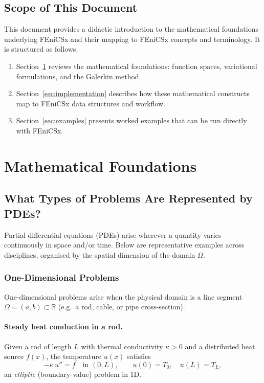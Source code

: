 \documentclass[11pt]{article}
\newcommand{\R}{\mathbb{R}}
\newcommand{\domain}{\Omega}
\begin{document}
\subsection{Scope of This Document}

This document provides a didactic introduction to the mathematical foundations
underlying FEniCSx and their mapping to FEniCSx concepts and terminology.
It is structured as follows:
\begin{enumerate}
  \item Section~\ref{sec:math} reviews the mathematical foundations:
    function spaces, variational formulations, and the Galerkin method.
  \item Section~\ref{sec:implementation} describes how these mathematical
    constructs map to FEniCSx data structures and workflow.
  \item Section~\ref{sec:examples} presents worked examples that can be
    run directly with FEniCSx.
\end{enumerate}

\section{Mathematical Foundations}
\label{sec:math}

\subsection{What Types of Problems Are Represented by PDEs?}
\label{subsec:pde-types}

Partial differential equations (PDEs) arise wherever a quantity varies
continuously in space and/or time.
Below are representative examples across disciplines, organised by the spatial
dimension of the domain $\domain$.

\subsubsection{One-Dimensional Problems}

One-dimensional problems arise when the physical domain is a line segment
$\domain = (a,b) \subset \R$ (e.g.\ a rod, cable, or pipe cross-section).

\paragraph{Steady heat conduction in a rod.}
Given a rod of length $L$ with thermal conductivity $\kappa > 0$ and a
distributed heat source $f(x)$, the temperature $u(x)$ satisfies
\begin{equation*}
  -\kappa\,u'' = f \quad \text{in } (0,L),
  \qquad u(0) = T_0,\quad u(L) = T_L,
\end{equation*}
an \emph{elliptic} (boundary-value) problem in 1D.
\end{document}
